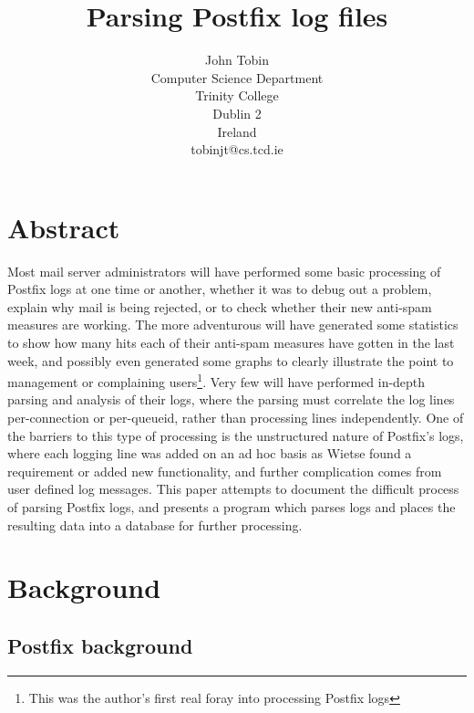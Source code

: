 \documentclass[a4paper,12pt,draft]{article}
\begin{document}
\title{Parsing Postfix log files}
\author{John Tobin \\ Computer Science Department \\ Trinity College \\
Dublin 2 \\ Ireland \\ tobinjt@cs.tcd.ie}
\date{}
\maketitle

\section{Abstract}

Most mail server administrators will have performed some basic processing
of Postfix logs at one time or another, whether it was to debug out a
problem, explain why mail is being rejected, or to check whether their new
anti-spam measures are working.  The more adventurous will have generated
some statistics to show how many hits each of their anti-spam measures have
gotten in the last week, and possibly even generated some graphs to clearly
illustrate the point to management or complaining users\footnote{This was
the author's first real foray into processing Postfix logs}.  Very few will
have performed in-depth parsing and analysis of their logs, where the
parsing must correlate the log lines per-connection or per-queueid, rather
than processing lines independently.  One of the barriers to this type of
processing is the unstructured nature of Postfix's logs, where each logging
line was added on an ad hoc basis as Wietse found a requirement or added
new functionality, and further complication comes from user defined log
messages.  This paper attempts to document the difficult process of parsing
Postfix logs, and presents a program which parses logs and places the
resulting data into a database for further processing.


\section{Background}

\subsection{Postfix background}
\end{document}

